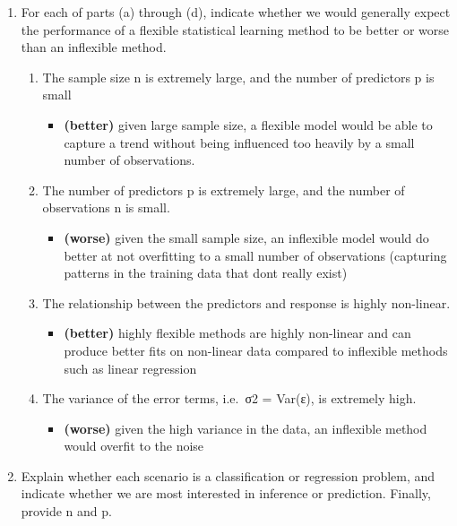 \documentclass[]{book}
\providecommand{\tightlist}{%
  \setlength{\itemsep}{0pt}\setlength{\parskip}{0pt}}
\begin{document}
\begin{enumerate}
\def\labelenumi{\arabic{enumi}.}
\tightlist
\item
  For each of parts (a) through (d), indicate whether we would generally expect the performance of a flexible statistical learning method to be better or worse than an inflexible method.

  \begin{enumerate}
  \def\labelenumii{(\alph{enumii})}
  \tightlist
  \item
    The sample size n is extremely large, and the number of predictors p is small

    \begin{itemize}
    \tightlist
    \item
      \textbf{(better)} given large sample size, a flexible model would be able to capture a trend without being influenced too heavily by a small number of observations.
    \end{itemize}
  \item
    The number of predictors p is extremely large, and the number of observations n is small.

    \begin{itemize}
    \tightlist
    \item
      \textbf{(worse)} given the small sample size, an inflexible model would do better at not overfitting to a small number of observations (capturing patterns in the training data that dont really exist)
    \end{itemize}
  \item
    The relationship between the predictors and response is highly non-linear.

    \begin{itemize}
    \tightlist
    \item
      \textbf{(better)} highly flexible methods are highly non-linear and can produce better fits on non-linear data compared to inflexible methods such as linear regression
    \end{itemize}
  \item
    The variance of the error terms, i.e.~σ2 = Var(ε), is extremely high.

    \begin{itemize}
    \tightlist
    \item
      \textbf{(worse)} given the high variance in the data, an inflexible method would overfit to the noise
    \end{itemize}
  \end{enumerate}
\item
  Explain whether each scenario is a classification or regression problem, and indicate whether we are most interested in inference or prediction. Finally, provide n and p.
\end{enumerate}
\end{document}
